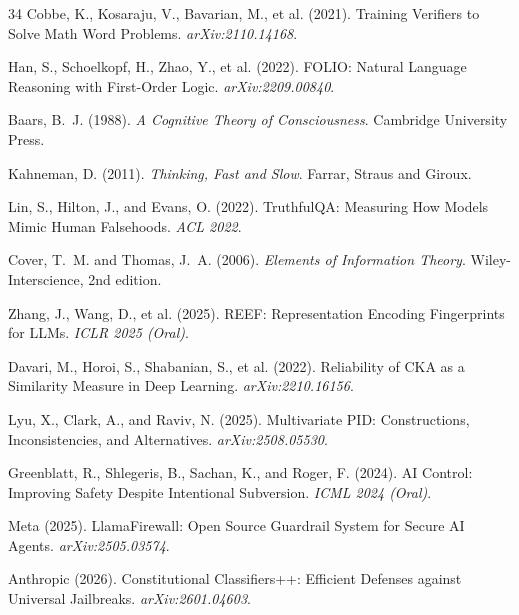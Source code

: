 \documentclass[11pt,a4paper]{article}
\theoremstyle{definition}
\begin{document}
\begin{thebibliography}{34}
Cobbe, K., Kosaraju, V., Bavarian, M., et al. (2021).
\newblock Training Verifiers to Solve Math Word Problems.
\newblock \emph{arXiv:2110.14168}.

Han, S., Schoelkopf, H., Zhao, Y., et al. (2022).
\newblock FOLIO: Natural Language Reasoning with First-Order Logic.
\newblock \emph{arXiv:2209.00840}.

Baars, B.~J. (1988).
\newblock \emph{A Cognitive Theory of Consciousness}.
\newblock Cambridge University Press.

Kahneman, D. (2011).
\newblock \emph{Thinking, Fast and Slow}.
\newblock Farrar, Straus and Giroux.

Lin, S., Hilton, J., and Evans, O. (2022).
\newblock TruthfulQA: Measuring How Models Mimic Human Falsehoods.
\newblock \emph{ACL 2022}.

Cover, T.~M. and Thomas, J.~A. (2006).
\newblock \emph{Elements of Information Theory}.
\newblock Wiley-Interscience, 2nd edition.

Zhang, J., Wang, D., et al. (2025).
\newblock REEF: Representation Encoding Fingerprints for LLMs.
\newblock \emph{ICLR 2025 (Oral)}.

Davari, M., Horoi, S., Shabanian, S., et al. (2022).
\newblock Reliability of CKA as a Similarity Measure in Deep Learning.
\newblock \emph{arXiv:2210.16156}.

Lyu, X., Clark, A., and Raviv, N. (2025).
\newblock Multivariate PID: Constructions, Inconsistencies, and Alternatives.
\newblock \emph{arXiv:2508.05530}.

Greenblatt, R., Shlegeris, B., Sachan, K., and Roger, F. (2024).
\newblock AI Control: Improving Safety Despite Intentional Subversion.
\newblock \emph{ICML 2024 (Oral)}.

Meta (2025).
\newblock LlamaFirewall: Open Source Guardrail System for Secure AI Agents.
\newblock \emph{arXiv:2505.03574}.

Anthropic (2026).
\newblock Constitutional Classifiers++: Efficient Defenses against Universal Jailbreaks.
\newblock \emph{arXiv:2601.04603}.


\end{thebibliography}
\end{document}
